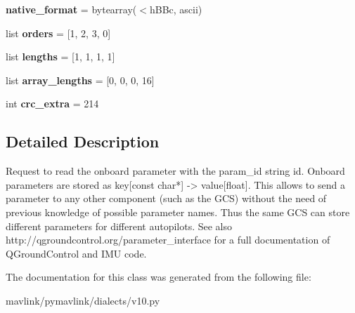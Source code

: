 \begin{DoxyCompactItemize}
\item 
\mbox{\label{classpymavlink_1_1dialects_1_1v10_1_1MAVLink__param__request__read__message_a1067e9401c510dc07038f50c8c2f04b6}} 
{\bfseries native\+\_\+format} = bytearray(\textquotesingle{}$<$h\+B\+Bc\textquotesingle{}, \textquotesingle{}ascii\textquotesingle{})
\item 
\mbox{\label{classpymavlink_1_1dialects_1_1v10_1_1MAVLink__param__request__read__message_a8215a41d088957d5e444411e6147abb5}} 
list {\bfseries orders} = \mbox{[}1, 2, 3, 0\mbox{]}
\item 
\mbox{\label{classpymavlink_1_1dialects_1_1v10_1_1MAVLink__param__request__read__message_ac6f9b9abd0f52127a397bd1d513b2efa}} 
list {\bfseries lengths} = \mbox{[}1, 1, 1, 1\mbox{]}
\item 
\mbox{\label{classpymavlink_1_1dialects_1_1v10_1_1MAVLink__param__request__read__message_a3a04b6d415ff7383fbc508b619e51a31}} 
list {\bfseries array\+\_\+lengths} = \mbox{[}0, 0, 0, 16\mbox{]}
\item 
\mbox{\label{classpymavlink_1_1dialects_1_1v10_1_1MAVLink__param__request__read__message_ad4a430bb45b2698519161416fe92569d}} 
int {\bfseries crc\+\_\+extra} = 214
\end{DoxyCompactItemize}


\subsection{Detailed Description}
\begin{DoxyVerb}Request to read the onboard parameter with the param_id string
id. Onboard parameters are stored as key[const char*] ->
value[float]. This allows to send a parameter to any other
component (such as the GCS) without the need of previous
knowledge of possible parameter names. Thus the same GCS can
store different parameters for different autopilots. See also
http://qgroundcontrol.org/parameter_interface for a full
documentation of QGroundControl and IMU code.
\end{DoxyVerb}
 

The documentation for this class was generated from the following file\+:\begin{DoxyCompactItemize}
\item 
mavlink/pymavlink/dialects/v10.\+py\end{DoxyCompactItemize}
